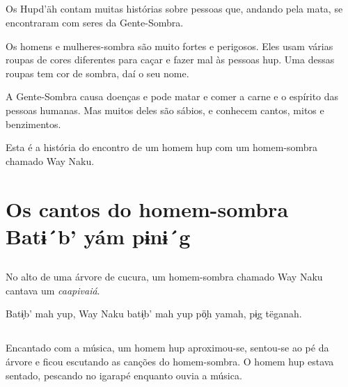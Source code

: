 \chapter*{}

Os Hupd'äh contam muitas histórias sobre pessoas que, andando pela mata, se
encontraram com seres da Gente-Sombra.

Os homens e mulheres-sombra são muito fortes e perigosos. Eles usam várias roupas de cores diferentes para caçar e fazer mal às pessoas hup. Uma dessas roupas tem cor de sombra,
daí o seu nome.

A Gente-Sombra causa doenças e pode matar e comer a carne e o espírito das pessoas humanas. Mas muitos deles são sábios, e conhecem cantos, mitos e benzimentos.

Esta é a história do encontro de um homem hup com um homem-sombra chamado Way Naku.

\openany

\blankpage
\part[Os cantos do homem-sombra]{Os cantos do homem-sombra\\Batɨ´b’ yám pɨnɨ´g}


\chapter*{}

\mbox{}\vspace*{\fill}

No alto de uma árvore de
cucura, um homem-sombra
chamado Way Naku cantava
um \textit{caapivaiá}.

\bigskip

Batɨ̗b’ mah yup, Way Naku
batɨ̗b’ mah yup pö̗h yamah,
pɨ̗g tëganah.

\vspace*{\fill}

\blankpage

\chapter*{}

\mbox{}\vspace*{\fill}

Encantado com a música,
um homem hup aproximou-se, sentou-se ao pé da
árvore e ficou escutando as
canções do homem-sombra. O
homem hup estava sentado,
pescando no igarapé
enquanto ouvia a música.

